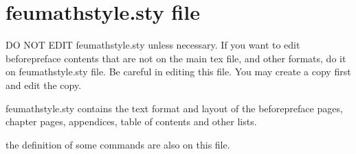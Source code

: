 \chapter{feumathstyle.sty file}
\label{chap:feumathstyle}

DO NOT EDIT feumathstyle.sty unless necessary. If you want to edit beforepreface contents that are not on the main tex file, and other formats, do it on feumathstyle.sty file.  Be careful in editing this file. You may create a copy first and edit the copy.

feumathstyle.sty contains the text format and layout of the beforepreface pages, chapter pages, appendices, table of contents and other lists.

the definition of some commands are also on this file. 